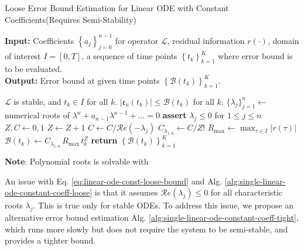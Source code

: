 \documentclass[accepted]{uai2023}
\newcommand{\Err}{\mathfrak{e}}
\newcommand{\Bound}{\mathcal{B}}
\renewcommand{\L}{\mathcal{L}}
\renewcommand{\Re}[1]{\mathcal{R}e\left(#1\right)}
\begin{document}
    \begin{algorithm}
        \small
        \caption{Loose Error Bound Estimation for Linear ODE with Constant Coefficients\quad (Requires Semi-Stability)}\label{alg:single-linear-ode-constant-coeff-loose}
        \textbf{Input:} Coefficients $\left\{a_j\right\}_{j=0}^{n-1}$ for operator $\L$, residual information $r(\cdot)$, domain of interest $I = [0, T]$, a sequence of time points $\left\{t_k\right\}_{k=1}^{K}$ where error bound is to be evaluated.\\
        \textbf{Output:} Error bound at given time points $\left\{\Bound(t_k)\right\}_{k=1}^{K}$.

        \begin{algorithmic}
            \Require $\L$ is stable, and $t_k \in I$ for all $k$.
            \Ensure $\left|\Err_u(t_k)\right| \leq \Bound(t_k)$ for all $k$. 
            \State $\{\lambda_j\}_{j=1}^{n} \gets$ numerical roots of $\lambda^n+a_{n-1}\lambda^{n-1}+\dots=0$ 
            \State \textbf{assert} $\lambda_j \leq 0$ for $1 \leq j \leq n$ 
            \State $Z, C \gets 0, 1$
                \If{$\Re{\lambda_j} = 0$}
                    \State $Z \gets Z + 1$
                \Else
                    \State $C \gets C / \Re{-\lambda_j}$
                \EndIf
            \EndFor
            \State $C_{\lambda_{1:n}}\gets C / Z!$
            \State $R_{\max} \gets \max_{\tau \in I} |r(\tau)|$ 
                \State $\Bound(t_k) \gets C_{\lambda_{1:n}}\, R_{\max}\, t_k^{Z} $
            \EndFor
            \State \textbf{return} $\left\{\Bound(t_k)\right\}_{k=1}^{K}$
        \end{algorithmic}
        \vspace{0.5em} 
        \textbf{Note}: Polynomial roots is solvable with \cite{jenkins1970three}
    \end{algorithm}

    An issue with Eq. \ref{eq:linear-ode-const-loose-bound} and Alg. \ref{alg:single-linear-ode-constant-coeff-loose} is that it assumes $\Re{\lambda_j} \leq 0$ for all characteristic roots $\lambda_j$. 
    This is true only for stable ODEs. 
    To address this issue, we propose an alternative error bound estimation Alg. \ref{alg:single-linear-ode-constant-coeff-tight}, which runs more slowly but does not require the system to be semi-stable, and provides a tighter bound.
\end{document}
